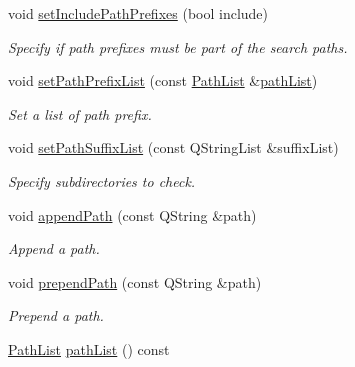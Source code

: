 \begin{DoxyCompactItemize}
\item 
void \hyperlink{class_mdt_1_1_deploy_utils_1_1_search_path_list_a3f10eadc3981b72ac9d2efc54484fa9a}{set\+Include\+Path\+Prefixes} (bool include)
\begin{DoxyCompactList}\small\item\em Specify if path prefixes must be part of the search paths. \end{DoxyCompactList}\item 
void \hyperlink{class_mdt_1_1_deploy_utils_1_1_search_path_list_ab850ca5b09572c85f38d9a2b0d56608b}{set\+Path\+Prefix\+List} (const \hyperlink{class_mdt_1_1_deploy_utils_1_1_path_list}{Path\+List} \&\hyperlink{class_mdt_1_1_deploy_utils_1_1_search_path_list_aa7c7f8f31e4ce1aaabdcdd03eb8f1256}{path\+List})
\begin{DoxyCompactList}\small\item\em Set a list of path prefix. \end{DoxyCompactList}\item 
void \hyperlink{class_mdt_1_1_deploy_utils_1_1_search_path_list_a80e2b88c150cf3916871845d041566f1}{set\+Path\+Suffix\+List} (const Q\+String\+List \&suffix\+List)
\begin{DoxyCompactList}\small\item\em Specify subdirectories to check. \end{DoxyCompactList}\item 
void \hyperlink{class_mdt_1_1_deploy_utils_1_1_search_path_list_ad06c34f840769dc0ba75fd3c3442ecbf}{append\+Path} (const Q\+String \&path)
\begin{DoxyCompactList}\small\item\em Append a path. \end{DoxyCompactList}\item 
void \hyperlink{class_mdt_1_1_deploy_utils_1_1_search_path_list_a09e1456243ac5616681d201f4fbbe1c1}{prepend\+Path} (const Q\+String \&path)
\begin{DoxyCompactList}\small\item\em Prepend a path. \end{DoxyCompactList}\item 
\hyperlink{class_mdt_1_1_deploy_utils_1_1_path_list}{Path\+List} \hyperlink{class_mdt_1_1_deploy_utils_1_1_search_path_list_aa7c7f8f31e4ce1aaabdcdd03eb8f1256}{path\+List} () const \hypertarget{class_mdt_1_1_deploy_utils_1_1_search_path_list_aa7c7f8f31e4ce1aaabdcdd03eb8f1256}{}\label{class_mdt_1_1_deploy_utils_1_1_search_path_list_aa7c7f8f31e4ce1aaabdcdd03eb8f1256}


\end{DoxyCompactItemize}
